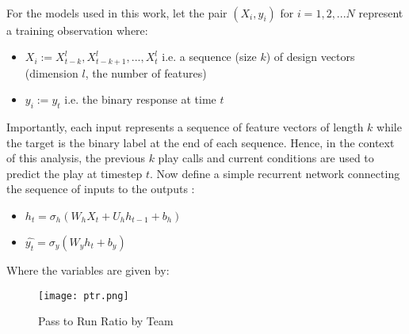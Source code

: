\documentclass[11pt]{article}
\begin{document}
\begin{multicols*}{2}
                \paragraph{}
                    For the models used in this work, let the pair $(X_i, y_i)$ for $i = 1,2,...N$ represent a training observation where:
                    
                    \begin{itemize}
                        \item $X_i := X_{t-k}^l, X_{t-k+1}^l, ... , X_{t}^l$ i.e. a sequence (size $k$) of design vectors (dimension $l$, the number of features)  
                        \item $y_i := y_{t}$ i.e. the binary response at time $t$ 
                    \end{itemize}

                    Importantly, each input represents a sequence of feature vectors of length $k$ while the target is the binary label at the end of each sequence. 
                    Hence, in the context of this analysis, the previous $k$ play calls and current conditions are used to predict the play at timestep $t$. 
                    Now define a simple recurrent network connecting the sequence of inputs to the outputs \cite{Dupond19}:

                    \begin{itemize}
                        \item $h_t = \sigma_{h}(W_{h}X_{t} + U_{h}h_{t-1} + b_{h})$ 
                        \item $\hat{y_t} = \sigma_{y}(W_{y}h_{t} + b_{y})$ 
                    \end{itemize}

                    Where the variables are given by:



            \end{multicols*}
            \begin{figure}[ht]
                \texttt{[image: ptr.png]}
                \caption{Pass to Run Ratio by Team}
                \label{fig:Pass to Run Ratio by Team}
            \end{figure}
\end{document}
